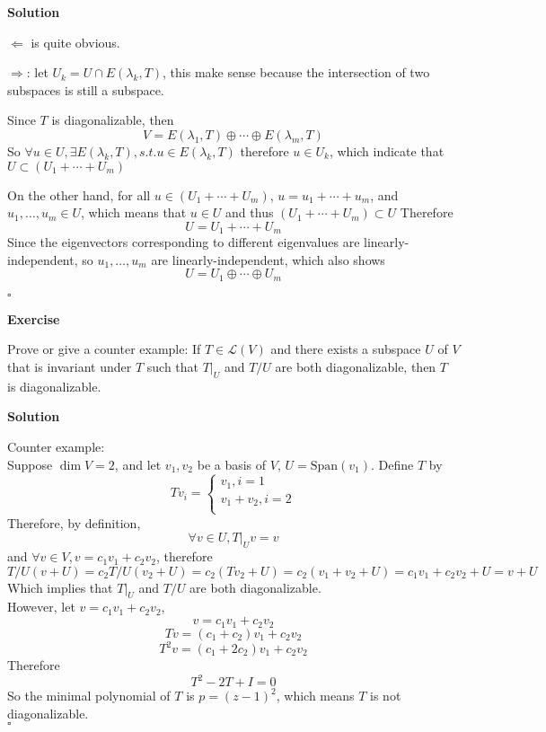 \documentclass{article}
\newenvironment{exercise}{%
{\textbf{Exercise\\}
    }
}{
}
\newenvironment{solution}{%
{
    \textbf{Solution\\}
    }
}{
  \hfill $\square$ 
  \par\bigskip 
}
\newcommand{\spans}{\text{Span}}
\begin{document}
\begin{CJK}{UTF8}{gkai}
\begin{solution}
    $\Leftarrow$ is quite obvious.

    $\Rightarrow$: let $U_k = U \cap E(\lambda_k,T)$, this make sense because the intersection of two subspaces is still a subspace.

    Since $T$ is diagonalizable, then 
    \[V = E (\lambda_1,T)\oplus\cdots\oplus E (\lambda_m,T)\]
    So $\forall u \in U, \exists E(\lambda_k,T), s.t. u \in E(\lambda_k,T)$ therefore $u \in U_k$, which indicate that $U \subset (U_1 + \cdots + U_m)$

    On the other hand, for all $u \in (U_1 + \cdots + U_m)$, $u = u_1 + \cdots + u_m$, and $u_1,\ldots,u_m \in U$, which means that $u \in U$ and thus $(U_1 + \cdots + U_m) \subset U$
    Therefore
    \[U = U_1+\cdots + U_m\]
    Since the eigenvectors corresponding to different eigenvalues are linearly-independent, so $u_1,\ldots,u_m$ are linearly-independent, which also shows 
    \[U = U_1\oplus \cdots \oplus  U_m\]
\end{solution}

\begin{exercise}
    Prove or give a counter example: If $T\in\mathcal{L}(V)$ and there exists a subspace $U$ of $V$ that is invariant under $T$ such that $T|_U$ and $T/U$ are both diagonalizable, then $T$ is diagonalizable.
\end{exercise}

\begin{solution}
    Counter example:\\

    Suppose $\dim V = 2$, and let $v_1,v_2$ be a basis of $V$, $U = \spans(v_1)$. Define $T$ by 
    \[Tv_i = \begin{cases}
        v_1,i = 1\\
        v_1 + v_2, i = 2\\
    \end{cases}\]
    Therefore, by definition,
    \[\forall v \in U, T|_U v = v \]
    and $\forall v \in V, v = c_1 v_1 + c_2 v_2$, therefore 
    \[T/U (v + U) = c_2 T/U (v_2 + U) = c_2 (Tv_2 + U) = c_2 (v_1 + v_2 + U) = c_1 v_1 + c_2 v_2 + U = v + U\]
    Which implies that $T|_U$ and $T/U$ are both diagonalizable.\\

    However, let $v = c_1 v_1 + c_2 v_2$,
    \[v = c_1 v_1 + c_2 v_2\]
    \[Tv = (c_1 + c_2) v_1 + c_2 v_2\]
    \[T^2 v = (c_1 + 2c_2) v_1 + c_2 v_2\]
    Therefore
    \[T^2 - 2T + I = 0\]
    So the minimal polynomial of $T$ is $p = (z - 1)^2$, which means $T$ is not diagonalizable.\\


\end{solution}
\end{CJK}
\end{document}
